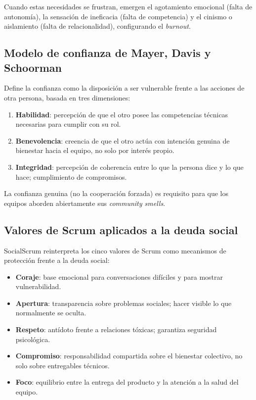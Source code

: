 Cuando estas necesidades se frustran, emergen el agotamiento emocional (falta de autonomía), la sensación de ineficacia (falta de competencia) y el cinismo o aislamiento (falta de relacionalidad), configurando el \textit{burnout}.

\subsection{Modelo de confianza de Mayer, Davis y Schoorman}

Define la confianza como la disposición a ser vulnerable frente a las acciones de otra persona, basada en tres dimensiones:

\begin{enumerate}
    \item \textbf{Habilidad}: percepción de que el otro posee las competencias técnicas necesarias para cumplir con su rol.
    \item \textbf{Benevolencia}: creencia de que el otro actúa con intención genuina de bienestar hacia el equipo, no solo por interés propio.
    \item \textbf{Integridad}: percepción de coherencia entre lo que la persona dice y lo que hace; cumplimiento de compromisos.
\end{enumerate}

La confianza genuina (no la cooperación forzada) es requisito para que los equipos aborden abiertamente sus \textit{community smells}.

\subsection{Valores de Scrum aplicados a la deuda social}

SocialScrum reinterpreta los cinco valores de Scrum como mecanismos de protección frente a la deuda social:

\begin{itemize}
    \item \textbf{Coraje}: base emocional para conversaciones difíciles y para mostrar vulnerabilidad.
    \item \textbf{Apertura}: transparencia sobre problemas sociales; hacer visible lo que normalmente se oculta.
    \item \textbf{Respeto}: antídoto frente a relaciones tóxicas; garantiza seguridad psicológica.
    \item \textbf{Compromiso}: responsabilidad compartida sobre el bienestar colectivo, no solo sobre entregables técnicos.
    \item \textbf{Foco}: equilibrio entre la entrega del producto y la atención a la salud del equipo.
\end{itemize}


